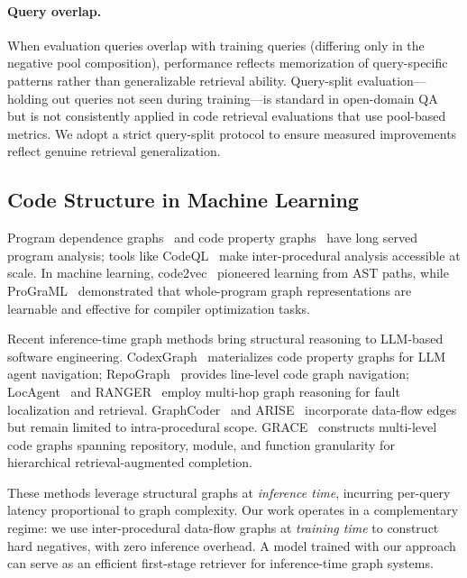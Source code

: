 \paragraph{Query overlap.}
When evaluation queries overlap with training queries (differing only in the negative pool composition), performance reflects memorization of query-specific patterns rather than generalizable retrieval ability.
Query-split evaluation---holding out queries not seen during training---is standard in open-domain QA~\cite{karpukhin2020dpr} but is not consistently applied in code retrieval evaluations that use pool-based metrics.
We adopt a strict query-split protocol to ensure measured improvements reflect genuine retrieval generalization.

\subsection{Code Structure in Machine Learning}
\label{sec:related-structure}

Program dependence graphs~\cite{ferrante1987pdg} and code property graphs~\cite{yamaguchi2014cpg} have long served program analysis; tools like CodeQL~\cite{avgustinov2016ql} make inter-procedural analysis accessible at scale.
In machine learning, code2vec~\cite{alon2019code2vec} pioneered learning from AST paths, while ProGraML~\cite{cummins2021programl} demonstrated that whole-program graph representations are learnable and effective for compiler optimization tasks.

Recent inference-time graph methods bring structural reasoning to LLM-based software engineering.
CodexGraph~\cite{liu2025codexgraph} materializes code property graphs for LLM agent navigation; RepoGraph~\cite{ouyang2025repograph} provides line-level code graph navigation; LocAgent~\cite{chen2025locagent} and RANGER~\cite{shah2025ranger} employ multi-hop graph reasoning for fault localization and retrieval.
GraphCoder~\cite{liu2024graphcoder} and ARISE~\cite{seddik2026arise} incorporate data-flow edges but remain limited to intra-procedural scope.
GRACE~\cite{wang2025grace} constructs multi-level code graphs spanning repository, module, and function granularity for hierarchical retrieval-augmented completion.

These methods leverage structural graphs at \emph{inference time}, incurring per-query latency proportional to graph complexity.
Our work operates in a complementary regime: we use inter-procedural data-flow graphs at \emph{training time} to construct hard negatives, with zero inference overhead.
A model trained with our approach can serve as an efficient first-stage retriever for inference-time graph systems.


